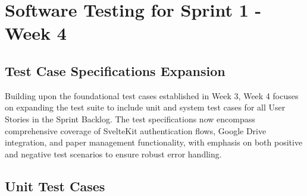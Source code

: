 \documentclass[12pt]{article}
\begin{document}
\section{Software Testing for Sprint 1 - Week 4}

\subsection{Test Case Specifications Expansion}
Building upon the foundational test cases established in Week 3, Week 4 focuses on expanding the test suite to include unit and system test cases for all User Stories in the Sprint Backlog. The test specifications now encompass comprehensive coverage of SvelteKit authentication flows, Google Drive integration, and paper management functionality, with emphasis on both positive and negative test scenarios to ensure robust error handling.

\subsection{Unit Test Cases}
\end{document}
